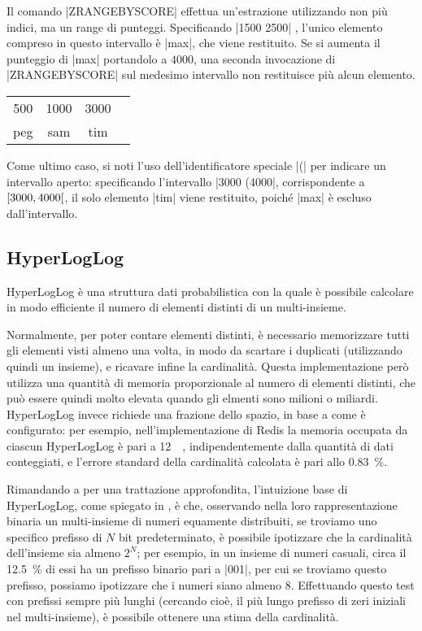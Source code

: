 Il comando \cverb|ZRANGEBYSCORE| effettua un'estrazione utilizzando non più indici, ma un range di
punteggi. Specificando \cverb|1500 2500| , l'unico elemento compreso in questo intervallo è
\cverb|max|, che viene restituito. Se si aumenta il punteggio di \cverb|max| portandolo a $4000$,
una seconda invocazione di \cverb|ZRANGEBYSCORE| sul medesimo intervallo non restituisce più
alcun elemento.

\begin{center}
	\begin{tabular}{|*{4}{c|}}
	  \hline
	  \num{500} & \num{1000} & \num{3000} & \cellcolor{blue!25}{\num{4000}} \\ 
	  peg & sam & tim & \cellcolor{blue!25}{max} \\ 
	  \hline
	\end{tabular}
\end{center}

Come ultimo caso, si noti l'uso dell'identificatore speciale \cverb|(| per indicare un intervallo
aperto: specificando l'intervallo \cverb|3000 (4000|, corrispondente a 
$\interval[open right]{3000}{4000}$, il solo elemento \cverb|tim| viene restituito, poiché \cverb|max|
è escluso dall'intervallo.

\subsection{HyperLogLog}

HyperLogLog \cite{hyperloglog} è una struttura dati probabilistica con la quale è possibile
calcolare in modo efficiente il numero di elementi distinti di un multi-insieme. 

Normalmente, per poter contare elementi distinti, è necessario memorizzare tutti gli elementi visti
almeno una volta, in modo da scartare i duplicati (utilizzando quindi un insieme), e ricavare infine
la cardinalità. Questa implementazione però utilizza una quantità di memoria proporzionale al numero
di elementi distinti, che può essere quindi molto elevata quando gli elmenti sono milioni o
miliardi. HyperLogLog invece richiede una frazione dello spazio, in base a come è configurato: per
esempio, nell'implementazione di Redis la memoria occupata da ciascun HyperLogLog è pari a
\SI{12}{\kibi\byte}, indipendentemente dalla quantità di dati conteggiati, e l'errore standard della
cardinalità calcolata è pari allo \SI{0.83}{\percent}.

Rimandando a \cite{hyperloglog} per una trattazione approfondita, l'intuizione base di HyperLogLog,
come spiegato in \cite{hyperloglog-explain}, è che, osservando nella loro rappresentazione binaria
un multi-insieme di numeri equamente distribuiti, se troviamo uno specifico prefisso di $N$ bit
predeterminato, è possibile ipotizzare che la cardinalità dell'insieme sia almeno $2^N$; per
esempio, in un insieme di numeri casuali, circa il \SI{12.5}{\percent} di essi ha un prefisso
binario pari a \cverb|001|, per cui se troviamo questo prefisso, possiamo ipotizzare che i numeri
siano almeno \num{8}. Effettuando questo test con prefissi sempre più lunghi (cercando cioè, il più
lungo prefisso di zeri iniziali nel multi-insieme), è possibile ottenere una stima della
cardinalità.

